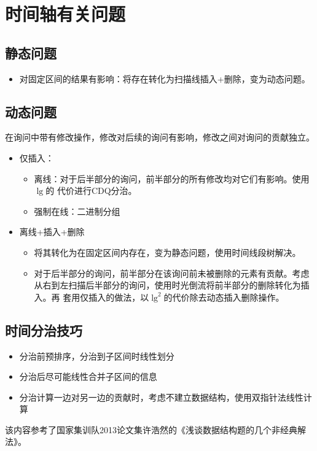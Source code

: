 \section{时间轴有关问题}
\subsection{静态问题}
\begin{itemize}
    \item 对固定区间的结果有影响：将存在转化为扫描线插入+删除，变为动态问题。
\end{itemize}
\subsection{动态问题}
在询问中带有修改操作，修改对后续的询问有影响，修改之间对询问的贡献独立。

\begin{itemize}
    \item 仅插入：
    \begin{itemize}
        \item 离线：对于后半部分的询问，前半部分的所有修改均对它们有影响。使用$\lg$的
        代价进行CDQ分治。
        \item 强制在线：二进制分组
    \end{itemize}
    \item 离线+插入+删除
    \begin{itemize}
        \item 将其转化为在固定区间内存在，变为静态问题，使用时间线段树解决。
        \item 对于后半部分的询问，前半部分在该询问前未被删除的元素有贡献。考虑
        从右到左扫描后半部分的询问，使用时光倒流将前半部分的删除转化为插入。再
        套用仅插入的做法，以$\lg^2$的代价除去动态插入删除操作。
    \end{itemize}
\end{itemize}
\subsection{时间分治技巧}
\begin{itemize}
    \item 分治前预排序，分治到子区间时线性划分
    \item 分治后尽可能线性合并子区间的信息
    \item 分治计算一边对另一边的贡献时，考虑不建立数据结构，使用双指针法线性计算
\end{itemize}

该内容参考了国家集训队2013论文集许浩然的《浅谈数据结构题的几个非经典解法》。
